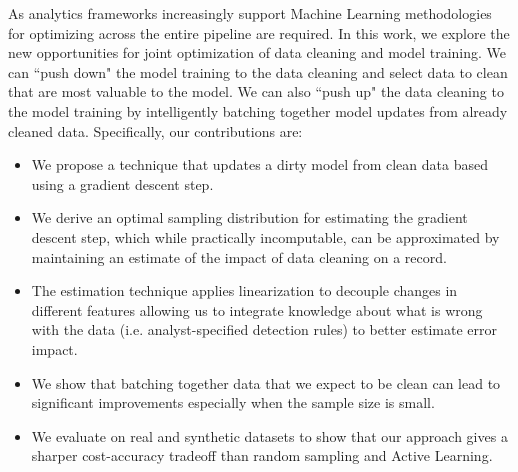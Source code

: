As analytics frameworks increasingly support Machine Learning methodologies for optimizing across the entire pipeline are required.
In this work, we explore the new opportunities for joint optimization of data cleaning and model training.
We can ``push down" the model training to the data cleaning and select data to clean that are most valuable to the model.
We can also ``push up" the data cleaning to the model training by intelligently batching together model updates from already cleaned data.
Specifically, our contributions are:
\begin{itemize}[noitemsep]
\item We propose a technique that updates a dirty model from clean data based using a gradient descent step.
\item We derive an optimal sampling distribution for estimating the gradient descent step, which while practically incomputable, can be approximated by maintaining an estimate of the impact of data cleaning on a record. 
\item The estimation technique applies linearization to decouple changes in different features allowing us to integrate knowledge about what is wrong with the data (i.e. analyst-specified detection rules) to better estimate error impact.
\item We show that batching together data that we expect to be clean can lead to significant improvements especially when the sample size is small.
\item We evaluate \sysfull on real and synthetic datasets to show that our approach gives a sharper cost-accuracy tradeoff than random sampling and Active Learning.
\end{itemize}







